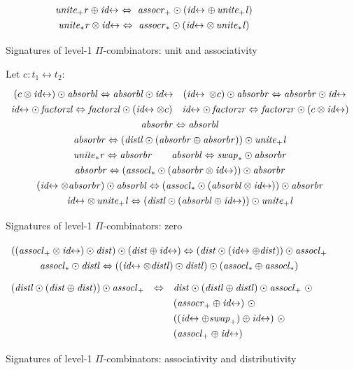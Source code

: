 \documentclass{article}
\newcommand{\identlp}{\mathit{unite}_+\mathit{l}}
\newcommand{\identlsp}{\mathit{unite}_+\mathit{r}}
\newcommand{\swapp}{\mathit{swap}_+}
\newcommand{\assoclp}{\mathit{assocl}_+}
\newcommand{\assocrp}{\mathit{assocr}_+}
\newcommand{\identlt}{\mathit{unite}_*\mathit{l}}
\newcommand{\identlst}{\mathit{unite}_*\mathit{r}}
\newcommand{\swapt}{\mathit{swap}_*}
\newcommand{\assoclt}{\mathit{assocl}_*}
\newcommand{\assocrt}{\mathit{assocr}_*}
\newcommand{\absorbr}{\mathit{absorbr}}
\newcommand{\absorbl}{\mathit{absorbl}}
\newcommand{\factorzr}{\mathit{factorzr}}
\newcommand{\factorzl}{\mathit{factorzl}}
\newcommand{\dist}{\mathit{dist}}
\newcommand{\distl}{\mathit{distl}}
\newcommand{\idc}{\mathit{id}\!\!\leftrightarrow}
\begin{document}
\begin{figure}[t]
\[\def\arraystretch{1.3}
\begin{array}{c}
  {\identlsp \oplus \idc ~\Leftrightarrow~ \assocrp \odot (\idc \oplus \, \identlp)}
\\
  {\identlst \otimes \idc ~\Leftrightarrow~ \assocrt \odot (\idc \otimes \, \identlt)}
\end{array}\]
\caption{\label{figd}Signatures of level-1 $\Pi$-combinators: unit and associativity}
\end{figure}


\begin{figure}[t]
Let $c : t_1 \leftrightarrow t_2$:
\[\def\arraystretch{1.3}
\begin{array}{c}
  {(c \otimes \idc) \odot \absorbl \Leftrightarrow \absorbl \odot \idc}
\quad
  {(\idc \, \otimes c) \odot \absorbr \Leftrightarrow \absorbr \odot \idc}
\\
  {\idc \odot \, \factorzl \Leftrightarrow \factorzl \odot (\idc \otimes c)}
\quad
  {\idc \odot \, \factorzr \Leftrightarrow \factorzr \odot (c \otimes \idc)}
\\
  {\absorbr \Leftrightarrow \absorbl}
\\
  {\absorbr \Leftrightarrow (\distl \odot (\absorbr \oplus \absorbr)) \odot \identlp}
\\
  {\identlst \Leftrightarrow \absorbr}
\qquad
  {\absorbl \Leftrightarrow \swapt \odot \absorbr}
\\
  {\absorbr \Leftrightarrow (\assoclt \odot (\absorbr \otimes \idc)) \odot \absorbr}
\\
  {(\idc \otimes \absorbr) \odot \absorbl \Leftrightarrow (\assoclt \odot (\absorbl \otimes \idc)) \odot \absorbr}
\\
  {\idc \otimes \, \identlp \Leftrightarrow (\distl \odot (\absorbl \oplus \idc)) \odot \identlp}
\end{array}\]
\caption{\label{figc}Signatures of level-1 $\Pi$-combinators: zero}
\end{figure}

\begin{figure}[t]
\[\def\arraystretch{1.3}
\begin{array}{c}
  {((\assoclp \otimes \idc) \odot \dist) \odot (\dist \oplus \idc) \Leftrightarrow (\dist \odot (\idc \oplus \dist)) \odot \assoclp}
\\
  {\assoclt \odot \distl \Leftrightarrow ((\idc \otimes \distl) \odot \distl) \odot (\assoclt \oplus \assoclt)}
\end{array}\]
\vspace{ -0.5em}
\[\def\arraystretch{1.3}
\begin{array}{rcl}
  (\distl \odot (\dist \oplus \dist)) \odot \assoclp &\Leftrightarrow&
   \dist \odot (\distl \oplus \distl) \odot \assoclp ~\odot \\
&& (\assocrp \oplus \idc) ~\odot \\
&& ((\idc \oplus \swapp) \oplus \idc) ~\odot \\
&&      (\assoclp \oplus \idc)
\end{array}\]
\caption{\label{figb}Signatures of level-1 $\Pi$-combinators: associativity and distributivity}
\end{figure}
\end{document}

